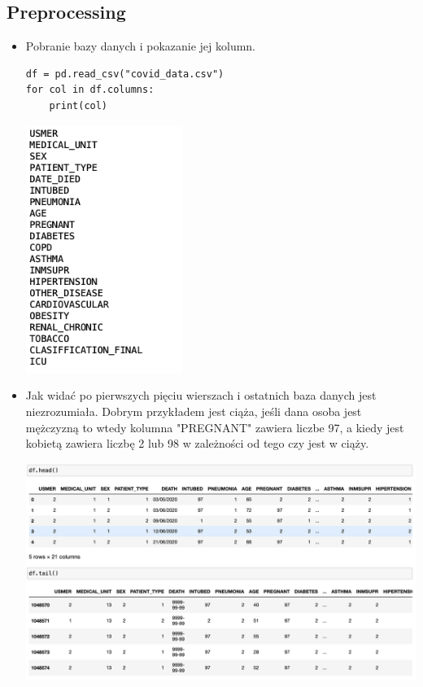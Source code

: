 \documentclass{article}
\begin{document}
\subsection{Preprocessing}
\newline\newline
\begin{itemize}

\item Pobranie bazy danych i pokazanie jej kolumn.
\begin{lstlisting}
df = pd.read_csv("covid_data.csv")
for col in df.columns:
    print(col)
\end{lstlisting}
\begin{center}
    \includegraphics[width=0.4\textwidth]{image1.png}\newline
\end{center}
\item Jak widać po pierwszych pięciu wierszach i ostatnich baza danych jest niezrozumiała. Dobrym przykładem jest ciąża, jeśli dana osoba jest mężczyzną to wtedy kolumna \newline"PREGNANT" zawiera liczbe 97, a kiedy jest kobietą zawiera liczbę 2 lub 98 w zależności od tego czy jest w ciąży.
\begin{center}
    \includegraphics[width=1.0\textwidth]{image2.png}\newline

\end{center}
\end{itemize}
\end{document}
